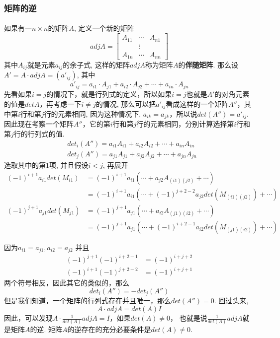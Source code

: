 \subsubsection{矩阵的逆}
\paragraph{}
如果有一$n\times n$的矩阵$A$, 定义一个新的矩阵
$$
adj A = \begin{bmatrix}
A_{11} & \cdots & A_{n1} \\
& \vdots & \\
A_{1n} & \cdots & A_{nn} 
\end{bmatrix}
$$
其中$A_{ij}$就是元素$a_{ij}$的余子式, 这样的矩阵$adj A$称为矩阵$A$的\textbf{伴随矩阵}. 那么设$A' = A \cdot adj A = (a'_{ij})$, 其中
$$
a'_{ij} = a_{i1} \cdot A_{j1} + a_{i2} \cdot A_{j2} + \cdots + a_{in} \cdot A_{jn}
$$
先看如果$i = j$的情况下，就是行列式的定义，所以如果$i = j$也就是$A'$的对角元素的值是$det A$，再考虑一下$i \neq j$的情况, 那么可以把$a'_{ij}$看成这样的一个矩阵$A''$，其中第$i$行和第$j$行的元素相同, 因为这种情况下, $a_{ik} = a_{jk}$，所以说$det(A'') = a'_{ij}$.  因此现在考察一个矩阵$A''$，它的第$i$行和第$j$行的元素相同，分别计算选择第$i$行和第$j$行的行列式的值.
\begin{align*}
& det_i(A'') = a_{i1}A_{i1} + a_{i2}A_{i2} + \cdots + a_{in}A_{in} \\
& det_j(A'') = a_{j1}A_{j1} + a_{j2}A_{j2} + \cdots + a_{jn}A_{jn} 
\end{align*}
选取其中的第$1$项, 并且假设$i < j$, 再展开
\begin{align*}
(-1)^{i+1}a_{i1}det(M_{i1})  & = (-1)^{i+1}a_{i1}(\cdots +  a_{j2}A_{(i1)(j2)} + \cdots )   \\
& =  (-1)^{i+1}a_{i1}(\cdots + (-1)^{j+2 - 2} a_{j2} det(M_{(i1)(j2)}) + \cdots ) \\
 (-1)^{j+1}a_{j1}det(M_{j1}) & = (-1)^{j+1}a_{j1}(\cdots +  a_{i2}A_{(j1)(i2)} + \cdots ) \\
 & =  (-1)^{j+1}a_{j1}(\cdots +  (-1)^{i+2-1} a_{i2} det(M_{(j1)(i2)}) + \cdots ) 
\end{align*}

因为$a_{i1} = a_{j1}, a_{i2} = a_{j2}$
并且
\begin{align*}
(-1)^{j+1}(-1)^{i + 2 - 1} & = (-1)^{i+j+2} \\
(-1)^{i+1}(-1)^{j+2 - 2} & = (-1)^{i+j+1}
\end{align*}
两个符号相反，因此其它的类似的，那么
$$
det_i(A'') = -det_j(A'')
$$
但是我们知道，一个矩阵的行列式存在并且唯一，那么$det(A'') = 0$.  回过头来, 
$$
A \cdot adj A = det(A) I
$$
因此，可以发现$A \cdot \frac{1}{det(A)} adj A = I$，如果$det(A) \neq 0$， 也就是说$\frac{1}{det(A)} adj A$就是矩阵$A$的逆. 矩阵$A$的逆存在的充分必要条件是$det(A) \neq 0$.

